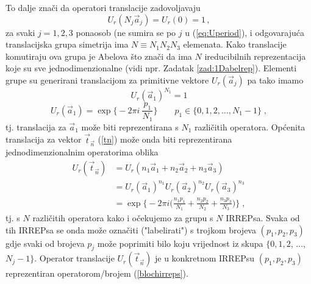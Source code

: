 To dalje znači da operatori translacije zadovoljavaju
\begin{equation}
       U_{r}(N_j \vec{a}_j) = U_{r}(0) = 1 \,,  
       \label{eq:Uperiod}
\end{equation}
za svaki $j=1,2,3$ ponaosob (ne sumira se po $j$ u (\ref{eq:Uperiod}),
i odgovarajuća translacijska grupa simetrija ima $N\equiv N_1 N_2 N_3$
elemenata. Kako translacije komutiraju ova grupa je Abelova što
znači da ima $N$ ireducibilnih reprezentacija koje su
sve jednodimenzionalne (vidi npr. Zadatak \ref{zad:1Dabelrep}).
Elementi grupe su generirani translacijom za primitivne vektore
$U_{r}(\vec{a}_j)$  pa tako imamo
\begin{equation}
U_{r}(\vec{a}_1)^{N_1} = 1 
\end{equation}
\begin{equation}
U_{r}(\vec{a}_1) = \exp\Big\{-2\pi i\: \frac{p_1 }{N_1}\Big\} \qquad 
 p_1 \in \{0,1,2,\ldots ,N_1 -1\} \;,
\end{equation}
tj. translacija za $\vec{a}_1$ može biti reprezentirana s
$N_1$ različitih operatora.  Općenita translacija za vektor 
$\vec{t}_{\vec{n}}$ (\ref{tn}) može onda biti reprezentirana jednodimenzionalnim
operatorima oblika
\begin{align}
 U_{r}(\vec{t}_{\vec{n}}) &=
 U_{r}(n_1 \vec{a}_1 + n_2 \vec{a}_2 + n_3  \vec{a}_3) \\
 &= U_{r}(\vec{a}_1)^{n_1} U_{r}(\vec{a}_2)^{n_2} U_{r}(\vec{a}_3)^{n_3} \\
 &= \exp\Big\{ -2\pi i \Big( \frac{n_1 p_1}{N_1} + \frac{n_2 p_2}{N_2} 
 + \frac{n_3 p_3}{N_3} \Big)\Big\} \;,
\label{blochirreps}
\end{align}
tj. s $N$ različitih operatora kako i očekujemo za grupu s $N$ IRREPsa.
Svaka od tih IRREPsa se onda može označiti ("labelirati") s trojkom brojeva $(p_1, p_2, p_3)$
gdje svaki od brojeva $p_j$ može poprimiti bilo koju vrijednost iz
skupa $\{0, 1, 2$, $\ldots$, $N_j -1\}$.
Operator translacije $U_{r}(\vec{t}_{\vec{n}})$ je u konkretnom IRREPsu 
 $(p_1, p_2, p_3)$ reprezentiran operatorom/brojem (\ref{blochirreps}).

